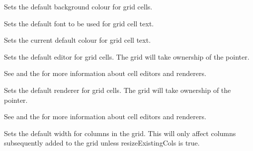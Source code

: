 
Sets the default background colour for grid cells.



\label{wxgridsetdefaultcellfont}


Sets the default font to be used for grid cell text.



\label{wxgridsetdefaultcelltextcolour}


Sets the current default colour for grid cell text.



\label{wxgridsetdefaulteditor}


Sets the default editor for grid cells. The grid will take ownership of the pointer.

See  and
the  for more information about cell editors and renderers.



\label{wxgridsetdefaultrenderer}


Sets the default renderer for grid cells. The grid will take ownership of the pointer.

See  and
the  for more information about cell editors and renderers.



\label{wxgridsetdefaultcolsize}


Sets the default width for columns in the grid. This will only affect columns subsequently added to
the grid unless resizeExistingCols is true.




